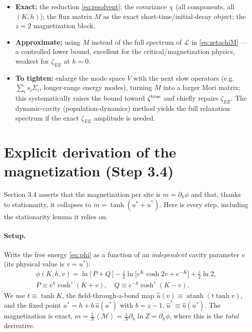 \documentclass[11pt]{article}
\newcommand{\atanh}{\operatorname{atanh}}
\newcommand{\mg}{\mathcal{M}}
\newcommand{\LL}{\mathcal{L}}
\newcommand{\avg}[1]{\left\langle #1 \right\rangle}
\newcommand{\Sig}{\Sigma}
\begin{document}
\begin{itemize}[topsep=2pt,itemsep=1pt]
\item \textbf{Exact:} the reduction \eqref{eq:resolvent}; the covariance $\chi$ (all components, all
$(K,h)$); the flux matrix $M$ as the exact short-time/initial-decay object; the $z=2$ magnetization
block.
\item \textbf{Approximate:} using $M$ instead of the full spectrum of $\LL$ in \eqref{eq:zetachiM} ---
a controlled lower bound, excellent for the critical/magnetization physics, weakest for $\zeta_{EE}$
at $h=0$.
\item \textbf{To tighten:} enlarge the mode space $V$ with the next slow operators
(e.g.\ $\sum_i s_i\Sig_i$, longer-range energy modes), turning $M$ into a larger Mori matrix; this
systematically raises the bound toward $\zeta^{\rm true}$ and chiefly repairs $\zeta_{EE}$. The
dynamic-cavity (population-dynamics) method yields the full relaxation spectrum if the exact
$\zeta_{EE}$ amplitude is needed.
\end{itemize}

\appendix

\section{Explicit derivation of the magnetization (Step 3.4)}
\label{app:mag}

Section 3.4 asserts that the magnetization per site is $m=\partial_h\phi$ and that, thanks to
stationarity, it collapses to $m=\tanh(u^*+\hat u^*)$. Here is every step, including the stationarity
lemma it relies on.

\paragraph{Setup.}
Write the free energy \eqref{eq:phi} as a function of an \emph{independent} cavity parameter $v$ (its
physical value is $v=u^*$):
\begin{gather*}
\phi(K,h,v)=\ln\big[\,P+Q\,\big]-\frac z2\ln\!\big[e^{K}\cosh2v+e^{-K}\big]+\frac z2\ln2,\\[3pt]
P\equiv e^{h}\cosh^{z}(K{+}v),\quad Q\equiv e^{-h}\cosh^{z}(K{-}v).
\end{gather*}
We use $t\equiv\tanh K$, the field-through-a-bond map $\hat u(v)\equiv\atanh(t\tanh v)$, and the fixed
point $u^*=h+b\,\hat u(u^*)$ with $b=z-1$, $\hat u^*\equiv\hat u(u^*)$. The magnetization is exact,
$m=\tfrac1N\avg{\mg}=\tfrac1N\partial_h\ln Z=\partial_h\phi$, where this is the \emph{total} derivative.
\end{document}
